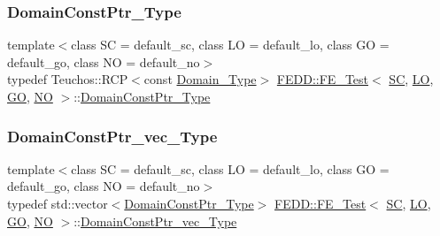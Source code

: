\mbox{\label{classFEDD_1_1FE__Test_a0a941851908a1e68d1554f8b28a7c72a}} 
\subsubsection{\texorpdfstring{Domain\+Const\+Ptr\+\_\+\+Type}{DomainConstPtr\_Type}}
{\footnotesize\ttfamily template$<$class SC  = default\+\_\+sc, class LO  = default\+\_\+lo, class GO  = default\+\_\+go, class NO  = default\+\_\+no$>$ \\
typedef Teuchos\+::\+R\+CP$<$const \hyperlink{classFEDD_1_1FE__Test_a5e414af507a141db0961c32bf6b19825}{Domain\+\_\+\+Type}$>$ \hyperlink{classFEDD_1_1FE__Test}{F\+E\+D\+D\+::\+F\+E\+\_\+\+Test}$<$ \hyperlink{fe__test__laplace_8cpp_a79c7e86a57edbb2a5a53242bcd04e41e}{SC}, \hyperlink{fe__test__laplace_8cpp_ad6a38c9f07d3fd633eefca5bccad8410}{LO}, \hyperlink{fe__test__laplace_8cpp_afa2946b509009b4f45eb04bd8c5b27d9}{GO}, \hyperlink{fe__test__laplace_8cpp_a5e24f37b28787429872b6ecb1d0417ce}{NO} $>$\+::\hyperlink{classFEDD_1_1FE__Test_a0a941851908a1e68d1554f8b28a7c72a}{Domain\+Const\+Ptr\+\_\+\+Type}}

\mbox{\label{classFEDD_1_1FE__Test_a3345ab320c9e19d77dc7fec9645da0d0}} 
\subsubsection{\texorpdfstring{Domain\+Const\+Ptr\+\_\+vec\+\_\+\+Type}{DomainConstPtr\_vec\_Type}}
{\footnotesize\ttfamily template$<$class SC  = default\+\_\+sc, class LO  = default\+\_\+lo, class GO  = default\+\_\+go, class NO  = default\+\_\+no$>$ \\
typedef std\+::vector$<$\hyperlink{classFEDD_1_1FE__Test_a0a941851908a1e68d1554f8b28a7c72a}{Domain\+Const\+Ptr\+\_\+\+Type}$>$ \hyperlink{classFEDD_1_1FE__Test}{F\+E\+D\+D\+::\+F\+E\+\_\+\+Test}$<$ \hyperlink{fe__test__laplace_8cpp_a79c7e86a57edbb2a5a53242bcd04e41e}{SC}, \hyperlink{fe__test__laplace_8cpp_ad6a38c9f07d3fd633eefca5bccad8410}{LO}, \hyperlink{fe__test__laplace_8cpp_afa2946b509009b4f45eb04bd8c5b27d9}{GO}, \hyperlink{fe__test__laplace_8cpp_a5e24f37b28787429872b6ecb1d0417ce}{NO} $>$\+::\hyperlink{classFEDD_1_1FE__Test_a3345ab320c9e19d77dc7fec9645da0d0}{Domain\+Const\+Ptr\+\_\+vec\+\_\+\+Type}}

